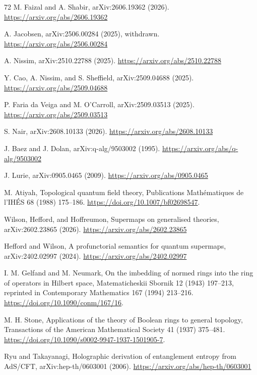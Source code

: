 \documentclass[11pt,letterpaper]{article}
\theoremstyle{definition}
\begin{document}
\begin{thebibliography}{72}
 M. Faizal and A. Shabir, arXiv:2606.19362 (2026). \url{https://arxiv.org/abs/2606.19362}

 A. Jacobsen, arXiv:2506.00284 (2025), withdrawn. \url{https://arxiv.org/abs/2506.00284}

 A. Nissim, arXiv:2510.22788 (2025). \url{https://arxiv.org/abs/2510.22788}

 Y. Cao, A. Nissim, and S. Sheffield, arXiv:2509.04688 (2025). \url{https://arxiv.org/abs/2509.04688}

 P. Faria da Veiga and M. O'Carroll, arXiv:2509.03513 (2025). \url{https://arxiv.org/abs/2509.03513}

 S. Nair, arXiv:2608.10133 (2026). \url{https://arxiv.org/abs/2608.10133}

 J. Baez and J. Dolan, arXiv:q-alg/9503002 (1995). \url{https://arxiv.org/abs/q-alg/9503002}

 J. Lurie, arXiv:0905.0465 (2009). \url{https://arxiv.org/abs/0905.0465}

 M. Atiyah, Topological quantum field theory, Publications Math\'ematiques de l'IH\'ES 68 (1988) 175--186. \url{https://doi.org/10.1007/bf02698547}.

 Wilson, Hefford, and Hoffreumon, Supermaps on generalised theories, arXiv:2602.23865 (2026). \url{https://arxiv.org/abs/2602.23865}

 Hefford and Wilson, A profunctorial semantics for quantum supermaps, arXiv:2402.02997 (2024). \url{https://arxiv.org/abs/2402.02997}

 I. M. Gelfand and M. Neumark, On the imbedding of normed rings into the ring of operators in Hilbert space, Matematicheskii Sbornik 12 (1943) 197--213, reprinted in Contemporary Mathematics 167 (1994) 213--216. \url{https://doi.org/10.1090/conm/167/16}.


 M. H. Stone, Applications of the theory of Boolean rings to general topology, Transactions of the American Mathematical Society 41 (1937) 375--481. \url{https://doi.org/10.1090/s0002-9947-1937-1501905-7}.

 Ryu and Takayanagi, Holographic derivation of entanglement entropy from AdS/CFT, arXiv:hep-th/0603001 (2006). \url{https://arxiv.org/abs/hep-th/0603001}


\end{thebibliography}
\end{document}
